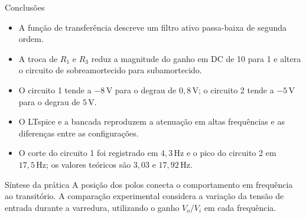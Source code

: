 \begin{frame}{Conclusões}
  \begin{itemize}
    \item A função de transferência descreve um filtro ativo passa-baixa de segunda ordem.
    \item A troca de $R_1$ e $R_3$ reduz a magnitude do ganho em DC de 10 para 1
      e altera o circuito de sobreamortecido para subamortecido.
    \item O circuito 1 tende a $-8\,\mathrm{V}$ para o degrau de $0{,}8\,\mathrm{V}$;
      o circuito 2 tende a $-5\,\mathrm{V}$ para o degrau de $5\,\mathrm{V}$.
    \item O LTspice e a bancada reproduzem a atenuação em altas frequências e
      as diferenças entre as configurações.
    \item O corte do circuito 1 foi registrado em $4{,}3\,\mathrm{Hz}$ e o pico do
      circuito 2 em $17{,}5\,\mathrm{Hz}$; os valores teóricos são $3{,}03$ e $17{,}92\,\mathrm{Hz}$.
  \end{itemize}

  \begin{alertblock}{Síntese da prática}
    A posição dos polos conecta o comportamento em frequência ao transitório.
    A comparação experimental considera a variação da tensão de entrada durante
    a varredura, utilizando o ganho $V_o/V_i$ em cada frequência.
  \end{alertblock}
\end{frame}
